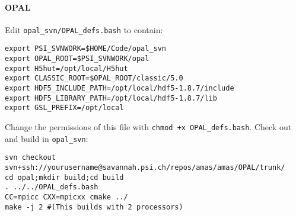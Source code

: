 \paragraph{OPAL}
Edit \verb+opal_svn/OPAL_defs.bash+ to contain:
\begin{footnotesize}
\begin{verbatim}
export PSI_SVNWORK=$HOME/Code/opal_svn
export OPAL_ROOT=$PSI_SVNWORK/opal
export H5hut=/opt/local/H5hut
export CLASSIC_ROOT=$OPAL_ROOT/classic/5.0
export HDF5_INCLUDE_PATH=/opt/local/hdf5-1.8.7/include
export HDF5_LIBRARY_PATH=/opt/local/hdf5-1.8.7/lib
export GSL_PREFIX=/opt/local
\end{verbatim}
\end{footnotesize}
Change the permissions of this file with \verb|chmod +x OPAL_defs.bash|. Check out and build \opal in \verb+opal_svn+:
\begin{footnotesize}
\begin{verbatim}
svn checkout svn+ssh://yourusername@savannah.psi.ch/repos/amas/amas/OPAL/trunk/
cd opal;mkdir build;cd build
. ../../OPAL_defs.bash
CC=mpicc CXX=mpicxx cmake ../
make -j 2 #(This builds with 2 processors)
\end{verbatim}
\end{footnotesize}




